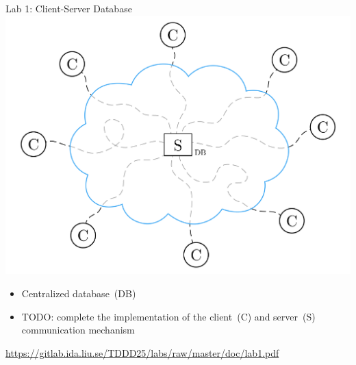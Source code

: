 \documentclass[compress,xcolor=table]{beamer}
\begin{document}
\begin{frame}{Lab 1: Client-Server Database}
  \centering
  \includegraphics[scale=0.10,page=1]{include/assets/single-server}
  \begin{itemize}
    \item Centralized database~(DB)
    \item \alert{TODO}: complete the implementation of the client~(C) and
    server~(S) communication mechanism
  \end{itemize}
  \begin{center}
    \scriptsize \url{https://gitlab.ida.liu.se/TDDD25/labs/raw/master/doc/lab1.pdf}
  \end{center}
\end{frame}
\end{document}
